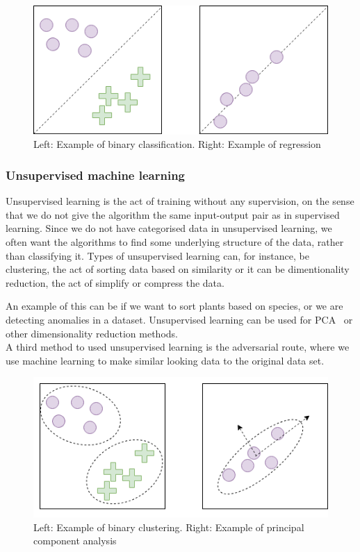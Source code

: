 \begin{figure}
    \centering
    \includegraphics[scale=0.5]{figures/class_vs_reg.png}
    \caption{Left: Example of binary classification. Right: Example of regression} 
\end{figure}
  


\subsubsection{Unsupervised machine learning}
Unsupervised learning is the act of training without any supervision, on the sense that we do not give the algorithm the same input-output pair as in supervised learning. 
Since we do not have categorised data in unsupervised learning, we often want the algorithms to find some underlying structure of the data, rather than classifying it.
Types of unsupervised learning can, for instance, be clustering, the act of sorting data based on similarity or it can be dimentionality reduction, the act of simplify or compress the data.

An example of this can be if we want to sort plants based on species, or we are detecting anomalies in a dataset. Unsupervised learning can be used for PCA~ %
or other dimensionality reduction methods.\\
A third method to used unsupervised learning is the adversarial route, where we use machine learning to make similar looking data to the original data set. 
        
\begin{figure}
    \centering
    \includegraphics[scale=0.5]{figures/cluster_pca.png}
    \caption{Left: Example of binary clustering. Right: Example of principal component analysis} 
\end{figure}

